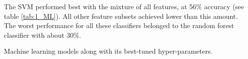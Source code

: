 The SVM performed best with the mixture of all features, at 56\% accuracy (see table \ref{tab:1_ML}). All other feature subsets achieved lower than this amount. The worst performance for all these classifiers belonged to the random forest classifier with about 30\%.

\begin{center}
	\begin{table*}[!t]
	\caption{Machine learning models along with its best-tuned hyper-parameters.}
	\label{tab:1_ML}
	\hspace{-1em}
	
	\end{table*}
\end{center}